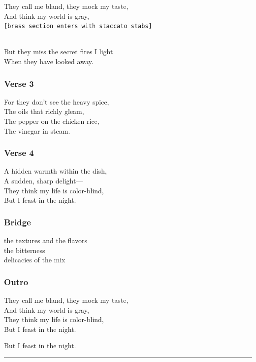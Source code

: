 They call me bland, they mock my taste,\\
And think my world is gray,\\
\texttt{{[}brass\ section\ enters\ with\ staccato\ stabs{]}}\strut \\
But they miss the secret fires I light\\
When they have looked away.

\subsubsection{Verse 3}\label{verse-3-1}

For they don't see the heavy spice,\\
The oils that richly gleam,\\
The pepper on the chicken rice,\\
The vinegar in steam.

\subsubsection{Verse 4}\label{verse-4-1}

A hidden warmth within the dish,\\
A sudden, sharp delight---\\
They think my life is color-blind,\\
But I feast in the night.

\subsubsection{Bridge}\label{bridge-2}

the textures and the flavors\\
the bitterness\\
delicacies of the mix

\subsubsection{Outro}\label{outro-1}

They call me bland, they mock my taste,\\
And think my world is gray,\\
They think my life is color-blind,\\
But I feast in the night.

But I feast in the night.

\begin{center}\rule{0.5\linewidth}{0.5pt}\end{center}

